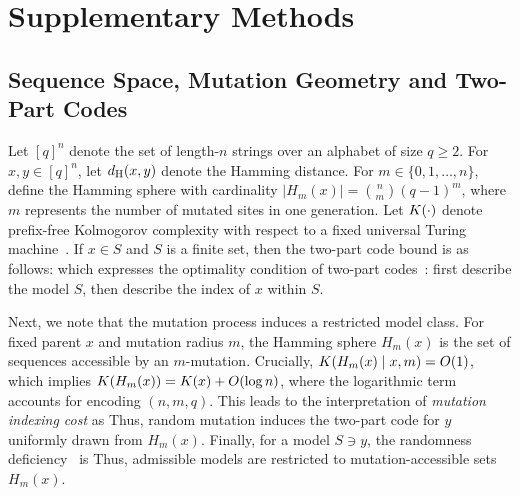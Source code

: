 
\pagestyle{empty}
\setcounter{equation}{0}
\renewcommand{\theequation}{S\arabic{equation}}

\setcounter{figure}{0}
\renewcommand{\thefigure}{S\arabic{figure}}

\setcounter{table}{0}
\renewcommand{\thetable}{S\arabic{table}}

\setcounter{theorem}{0}
\renewcommand{\thetheorem}{S\arabic{theorem}}
\setcounter{definition}{0}
\renewcommand{\thedefinition}{S\arabic{definition}}

\setcounter{lemma}{0}
\renewcommand{\thelemma}{S\arabic{lemma}}
\setcounter{corollary}{0}
\renewcommand{\thecorollary}{S\arabic{corollary}}


\section*{Supplementary Methods}


\subsection*{Sequence Space, Mutation Geometry and Two-Part Codes}\label{sec:si:setup}

Let $[q]^n$ denote the set of length-$n$ strings over an alphabet of size $q \ge 2$. For $x,y\in[q]^n$, let $d_{\mathrm{H}}(x,y)$ denote the Hamming distance.
For $m\in\{0,1,\dots,n\}$, define the Hamming sphere
with cardinality $|H_m(x)|=\binom{n}{m}(q-1)^m$, where $m$ represents the number of mutated sites in one generation.
Let $K(\cdot)$ denote prefix-free Kolmogorov complexity with respect to a fixed universal Turing machine~\cite{LiVitanyi2019}.
If $x\in S$ and $S$ is a finite set, then the two-part code bound is as follows:
which expresses the optimality condition of two-part codes~\cite{LiVitanyi2019,GacsTrompVitanyi2001}: first describe the model $S$, then describe the index of $x$ within $S$.

Next, we note that the mutation process induces a restricted model class. For fixed parent $x$ and mutation radius $m$, the Hamming sphere $H_m(x)$ is the set of sequences accessible by an $m$-mutation. Crucially, $K(H_m(x)\mid x,m)=O(1)$, which implies
$K(H_m(x))=K(x)+O(\log n)$,
where the logarithmic term accounts for encoding $(n,m,q)$.
This leads to the interpretation of \emph{mutation indexing cost} as
Thus, random mutation induces the two-part code
for $y$ uniformly drawn from $H_m(x)$.
Finally, for a model $S\ni y$, the randomness deficiency~\cite{LiVitanyi2019,GacsTrompVitanyi2001} is
Thus, admissible models are restricted to mutation-accessible sets $H_m(x)$.

